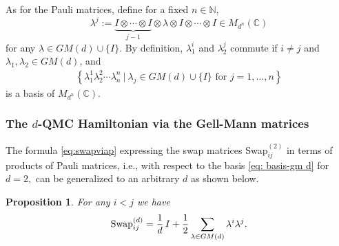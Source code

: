 \documentclass[12pt,dvipsnames,accepted=2016-08-18,a4paper,onecolumn]{quantumarticle}
\numberwithin{equation}{section}
\newcommand{\NN}{\mathbb N}
\newcommand{\CC}{\mathbb C}
\newtheorem{proposition}[theorem]{Proposition}
\theoremstyle{definition}
\begin{document}
As for the Pauli matrices, define for a fixed $n \in \NN,$
$$
\lambda^{j} := \underbrace{I \otimes \cdots \otimes I}_{j-1} \otimes \lambda \otimes I \otimes \cdots \otimes I \in M_{d^n}(\CC)
$$
for any $\lambda \in GM(d)\cup\{I\}$. By definition, $\lambda_1^i$ and $\lambda_2^j$ commute if $i \neq j$ and  $\lambda_1,\lambda_2 \in GM(d)$, and
\begin{align}\label{eq: basis-gm d}
	\left\{\lambda_{1}^1 \lambda_{2}^2 \cdots \lambda_{n}^n \ | \ \lambda_{j} \in GM(d)\cup\{I\}\text{ for }  j=1,\ldots,n\right\}
\end{align}
is a basis of $M_{d^n}(\CC).$ 

\subsubsection{The $d$-QMC Hamiltonian via the Gell-Mann matrices}\label{ssec:gelmann}
The formula \eqref{eq:swapviap} expressing the swap matrices Swap$^{(2)}_{ij}$ in terms of products of Pauli matrices, i.e., with respect to the basis \eqref{eq: basis-gm d} for $d=2,$ can be generalized to an arbitrary $d$ as shown below.

\begin{proposition}\label{prop:swaptogm}
	 For any $i<j$ we have
	\begin{align}\label{eq: sw-id}
		\text{\textnormal{Swap}}^{(d)}_{ij} = \frac{1}{d} \,I + \frac{1}{2} \sum_{\lambda \in GM(d)} \lambda^i \lambda^j.
	\end{align}
\end{proposition}
\end{document}
